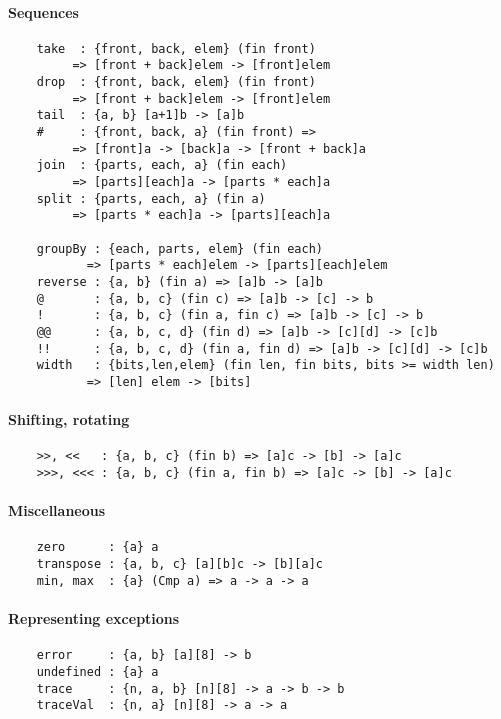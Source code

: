 \paragraph*{Sequences}
\begin{Verbatim}
    take  : {front, back, elem} (fin front)
         => [front + back]elem -> [front]elem
    drop  : {front, back, elem} (fin front)
         => [front + back]elem -> [front]elem
    tail  : {a, b} [a+1]b -> [a]b
    #     : {front, back, a} (fin front) =>
         => [front]a -> [back]a -> [front + back]a
    join  : {parts, each, a} (fin each)
         => [parts][each]a -> [parts * each]a
    split : {parts, each, a} (fin a)
         => [parts * each]a -> [parts][each]a

    groupBy : {each, parts, elem} (fin each)
           => [parts * each]elem -> [parts][each]elem
    reverse : {a, b} (fin a) => [a]b -> [a]b
    @       : {a, b, c} (fin c) => [a]b -> [c] -> b
    !       : {a, b, c} (fin a, fin c) => [a]b -> [c] -> b
    @@      : {a, b, c, d} (fin d) => [a]b -> [c][d] -> [c]b
    !!      : {a, b, c, d} (fin a, fin d) => [a]b -> [c][d] -> [c]b
    width   : {bits,len,elem} (fin len, fin bits, bits >= width len)
           => [len] elem -> [bits]
\end{Verbatim}
\paragraph*{Shifting, rotating}
\begin{Verbatim}
    >>, <<   : {a, b, c} (fin b) => [a]c -> [b] -> [a]c
    >>>, <<< : {a, b, c} (fin a, fin b) => [a]c -> [b] -> [a]c
\end{Verbatim}
\paragraph*{Miscellaneous}
\begin{Verbatim}
    zero      : {a} a
    transpose : {a, b, c} [a][b]c -> [b][a]c
    min, max  : {a} (Cmp a) => a -> a -> a
\end{Verbatim}
\paragraph*{Representing exceptions}
\begin{Verbatim}
    error     : {a, b} [a][8] -> b
    undefined : {a} a
    trace     : {n, a, b} [n][8] -> a -> b -> b
    traceVal  : {n, a} [n][8] -> a -> a
\end{Verbatim}

